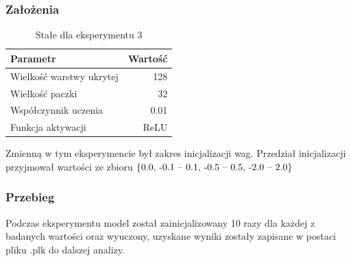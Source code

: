 \documentclass{article}
\begin{document}
\subsubsection*{Założenia}
\begin{table}[H]
	\caption{Stałe dla eksperymentu 3}
	\label{tabela-const-3}
	\centering
	\begin{tabular}{lr}
		\toprule
		Parametr                   & Wartość \\
		\midrule
		Wielkość warstwy ukrytej & 128       \\
		Wielkość paczki          & 32        \\
		Współczynnik uczenia     & 0.01      \\
		Funkcja aktywacji          & ReLU      \\
		\bottomrule
	\end{tabular}
\end{table}

Zmienną w tym eksperymencie był zakres inicjalizacji wag. Przedział inicjalizacji przyjmował wartości ze zbioru \(\{$0.0, -0.1 -- 0.1, -0.5 -- 0.5, -2.0 -- 2.0$\}\)
\subsubsection*{Przebieg}

Podczas eksperymentu model został zainicjalizowany 10 razy dla każdej z badanych wartości oraz wyuczony, uzyskane wyniki zostały zapisane w postaci pliku .plk do dalszej analizy.
\end{document}
